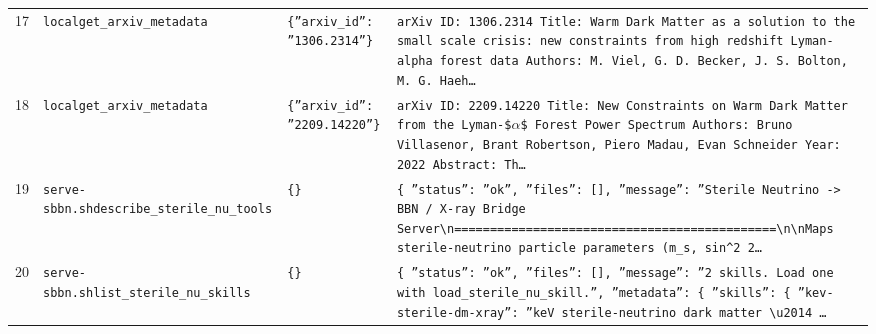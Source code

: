 \documentclass[11pt,a4paper]{article}
\begin{document}
\begin{longtable}{@{}p{}p{}p{}p{}@{}}
17 & \texttt{local}\newline\texttt{get\_\allowbreak{}arxiv\_\allowbreak{}metadata} & \texttt{\{''arxiv\_\allowbreak{}id'':\allowbreak{} ''1306.2314''\}\allowbreak{}} & \texttt{arXiv ID:\allowbreak{} 1306.2314 Title:\allowbreak{} Warm Dark Matter as a solution to the small scale crisis:\allowbreak{} new constraints from high redshift Lyman-alpha forest data Authors:\allowbreak{} M. Viel,\allowbreak{} G. D. Becker,\allowbreak{} J. S. Bolton,\allowbreak{} M. G. Haeh\ldots{}\allowbreak{}} \\
18 & \texttt{local}\newline\texttt{get\_\allowbreak{}arxiv\_\allowbreak{}metadata} & \texttt{\{''arxiv\_\allowbreak{}id'':\allowbreak{} ''2209.14220''\}\allowbreak{}} & \texttt{arXiv ID:\allowbreak{} 2209.14220 Title:\allowbreak{} New Constraints on Warm Dark Matter from the Lyman-\$$\alpha$\$ Forest Power Spectrum Authors:\allowbreak{} Bruno Villasenor,\allowbreak{} Brant Robertson,\allowbreak{} Piero Madau,\allowbreak{} Evan Schneider Year:\allowbreak{} 2022 Abstract:\allowbreak{} Th\ldots{}\allowbreak{}} \\
19 & \texttt{serve-sbbn.sh}\newline\texttt{describe\_\allowbreak{}sterile\_\allowbreak{}nu\_\allowbreak{}tools} & \texttt{\{\}\allowbreak{}} & \texttt{\{   ''status'':\allowbreak{} ''ok'',\allowbreak{}   ''files'':\allowbreak{} []\allowbreak{},\allowbreak{}   ''message'':\allowbreak{} ''Sterile Neutrino -\textgreater{}\allowbreak{} BBN /\allowbreak{} X-ray Bridge Server\textbackslash{}\allowbreak{}n=\allowbreak{}=\allowbreak{}=\allowbreak{}=\allowbreak{}=\allowbreak{}=\allowbreak{}=\allowbreak{}=\allowbreak{}=\allowbreak{}=\allowbreak{}=\allowbreak{}=\allowbreak{}=\allowbreak{}=\allowbreak{}=\allowbreak{}=\allowbreak{}=\allowbreak{}=\allowbreak{}=\allowbreak{}=\allowbreak{}=\allowbreak{}=\allowbreak{}=\allowbreak{}=\allowbreak{}=\allowbreak{}=\allowbreak{}=\allowbreak{}=\allowbreak{}=\allowbreak{}=\allowbreak{}=\allowbreak{}=\allowbreak{}=\allowbreak{}=\allowbreak{}=\allowbreak{}=\allowbreak{}=\allowbreak{}=\allowbreak{}=\allowbreak{}=\allowbreak{}=\allowbreak{}=\allowbreak{}=\allowbreak{}=\allowbreak{}=\allowbreak{}\textbackslash{}\allowbreak{}n\textbackslash{}\allowbreak{}nMaps sterile-neutrino particle parameters (m\_\allowbreak{}s,\allowbreak{} sin\textasciicircum{}\allowbreak{}2 2\ldots{}\allowbreak{}} \\
20 & \texttt{serve-sbbn.sh}\newline\texttt{list\_\allowbreak{}sterile\_\allowbreak{}nu\_\allowbreak{}skills} & \texttt{\{\}\allowbreak{}} & \texttt{\{   ''status'':\allowbreak{} ''ok'',\allowbreak{}   ''files'':\allowbreak{} []\allowbreak{},\allowbreak{}   ''message'':\allowbreak{} ''2 skills. Load one with load\_\allowbreak{}sterile\_\allowbreak{}nu\_\allowbreak{}skill.'',\allowbreak{}   ''metadata'':\allowbreak{} \{     ''skills'':\allowbreak{} \{       ''kev-sterile-dm-xray'':\allowbreak{} ''keV sterile-neutrino dark matter \textbackslash{}\allowbreak{}u2014 \ldots{}\allowbreak{}} \\

\end{longtable}
\end{document}
